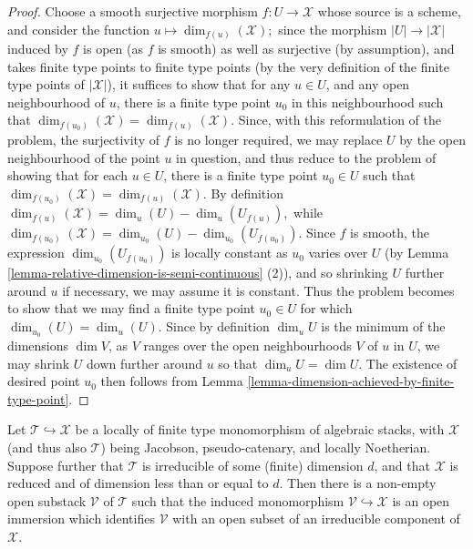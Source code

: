\begin{proof}
Choose a smooth surjective
morphism  $f:U \to \mathcal{X}$ whose source is a scheme, and consider the
function $u \mapsto \dim_{f(u)}(\mathcal{X});$
since the morphism $|U| \to |\mathcal{X}|$ induced by $f$ is open (as $f$
is smooth) as well as  surjective (by assumption),
and takes finite type points to finite type points (by the very definition
of the finite type points of $|\mathcal{X}|$),
it suffices to show that for any $u \in U$, and any open neighbourhood of $u$,
there is a finite type point $u_0$ in this neighbourhood such that
$\dim_{f(u_0)}(\mathcal{X}) = \dim_{f(u)}(\mathcal{X}).$
Since, with this reformulation
of the problem,  the surjectivity of $f$ is no longer required,
we may replace $U$ by the open neighbourhood of the point $u$ in question,
and thus reduce to the problem of showing that for each $u \in U$,
there is a finite type point $u_0 \in U$ such that
$\dim_{f(u_0)}(\mathcal{X}) = \dim_{f(u)}(\mathcal{X}).$
By definition
$\dim_{f(u)}(\mathcal{X}) = \dim_u(U) - \dim_u(U_{f(u)}),$
while
$\dim_{f(u_0)}(\mathcal{X}) = \dim_{u_0}(U) - \dim_{u_0}(U_{f(u_0)}).$
Since $f$ is smooth, the expression $\dim_{u_0}(U_{f(u_0)})$ is locally
constant as $u_0$ varies over $U$ (by
Lemma \ref{lemma-relative-dimension-is-semi-continuous} (2)),
and so shrinking $U$ further around
$u$ if necessary, we may assume it is constant.  Thus the problem
becomes to show that we may find a finite type point $u_0 \in U$
for which $\dim_{u_0}(U) = \dim_u(U)$.
Since by definition $\dim_u U$ is the minimum of the dimensions
$\dim V$, as $V$ ranges over the open neighbourhoods $V$ of $u$
in $U$, we may shrink $U$ down further around $u$ so that
$\dim_u U = \dim U$.
The existence of desired point $u_0$ then follows from
Lemma \ref{lemma-dimension-achieved-by-finite-type-point}.
\end{proof}

\begin{lemma}
\label{lemma-monomorphing-a-component-in-of-the-right-dimension}
Let $\mathcal{T} \hookrightarrow \mathcal{X}$ be a locally
of finite type monomorphism of algebraic stacks,
with $\mathcal{X}$ (and thus also $\mathcal{T}$)
being Jacobson, pseudo-catenary, and locally Noetherian.
Suppose further that $\mathcal{T}$ is irreducible
of some (finite) dimension $d$, and that $\mathcal{X}$ is reduced
and of dimension less
than or equal to $d$.
Then there is a non-empty open substack $\mathcal{V}$ of $\mathcal{T}$ such
that the induced
monomorphism $\mathcal{V} \hookrightarrow \mathcal{X}$ is an open immersion
which identifies
$\mathcal{V}$ with an open subset of an irreducible component of $\mathcal{X}$.
\end{lemma}

